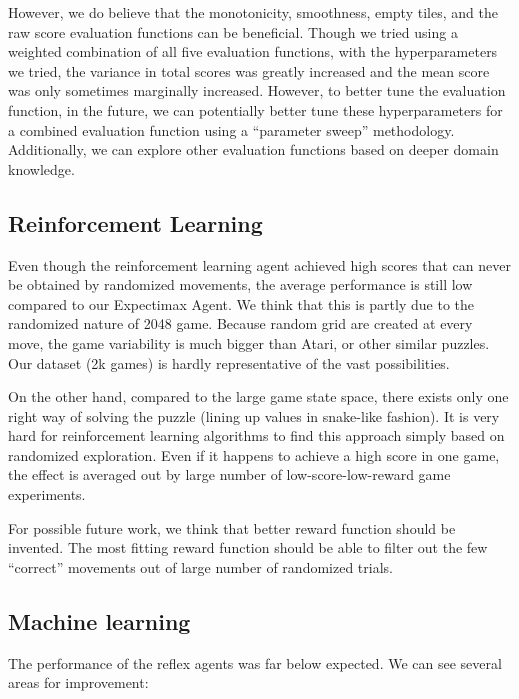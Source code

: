 \documentclass[9pt,twocolumn]{article}
\begin{document}
However, we do believe that the monotonicity, smoothness, empty tiles, and the raw score evaluation functions can be beneficial. Though we tried using a weighted combination of all five evaluation functions, with the hyperparameters we tried, the variance in total scores was greatly increased and the mean score was only sometimes marginally increased. However, to better tune the evaluation function, in the future, we can potentially better tune these hyperparameters for a combined evaluation function using a “parameter sweep” methodology. Additionally, we can explore other evaluation functions based on deeper domain knowledge.

\subsection{Reinforcement Learning}

Even though the reinforcement learning agent achieved high scores that can never be obtained by randomized movements, the average performance is still low compared to our Expectimax Agent. We think that this is partly due to the randomized nature of 2048 game. Because random grid are created at every move, the game variability is much bigger than Atari, or other similar puzzles. Our dataset (2k games) is hardly representative of the vast possibilities. 

On the other hand, compared to the large game state space, there exists only one right way of solving the puzzle (lining up values in snake-like fashion). It is very hard for reinforcement learning algorithms to find this approach simply based on randomized exploration. Even if it happens to achieve a high score in one game, the effect is averaged out by large number of low-score-low-reward game experiments.

For possible future work, we think that better reward function should be invented. The most fitting reward function should be able to filter out the few “correct” movements out of large number of randomized trials.

\subsection{Machine learning}

The performance of the reflex agents was far below expected. We can see several areas for improvement: 
\end{document}
